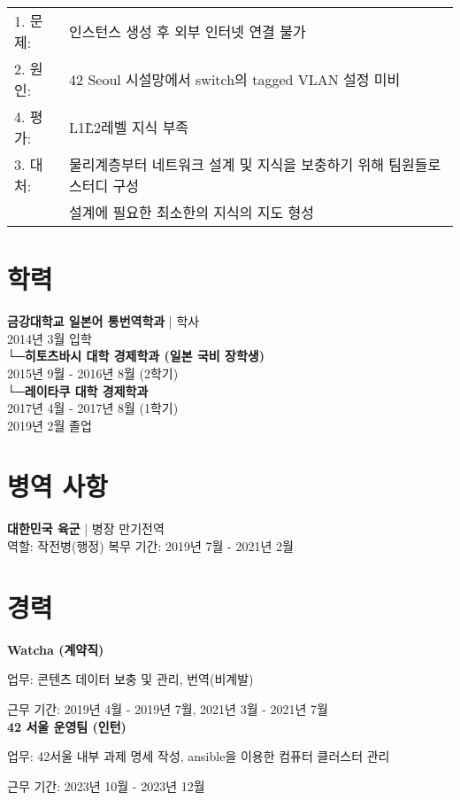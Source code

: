 \documentclass[11pt, a4paper]{article}
\begin{document}
\begin{tabular}{l l}
    1. 문제:&인스턴스 생성 후 외부 인터넷 연결 불가\\
    2. 원인:&42 Seoul 시설망에서 switch의 tagged VLAN 설정 미비\\
    4. 평가:&L1\~L2레벨 지식 부족\\
    3. 대처:&물리계층부터 네트워크 설계 및 지식을 보충하기 위해 팀원들로 스터디 구성\\
            &설계에 필요한 최소한의 지식의 지도 형성\\
\end{tabular}


\section{학력}
\textbf{금강대학교 일본어 통번역학과} | 학사\\
2014년 3월 입학\\
\hspace*{0.5cm}└─\textbf{히토츠바시 대학 경제학과 (일본 국비 장학생)}\\
\hspace*{1cm}2015년 9월 - 2016년 8월 (2학기)\\
\hspace*{0.5cm}└─\textbf{레이타쿠 대학 경제학과}\\
\hspace*{1cm}2017년 4월 - 2017년 8월 (1학기)\\
2019년 2월 졸업\\

\section{병역 사항}
\textbf{대한민국 육군} | 병장 만기전역\\
역할: 작전병(행정)
복무 기간: 2019년 7월 - 2021년 2월

\section{경력}
\textbf{Watcha (계약직)}

업무: 콘텐츠 데이터 보충 및 관리, 번역(비계발)

근무 기간: 2019년 4월 - 2019년 7월, 2021년 3월 - 2021년 7월\\
\textbf{42 서울 운영팀 (인턴)}

업무: 42서울 내부 과제 명세 작성, ansible을 이용한 컴퓨터 클러스터 관리

근무 기간: 2023년 10월 - 2023년 12월
\end{document}
